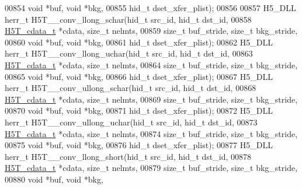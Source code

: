 \begin{DoxyCode}
00854                                      \textcolor{keywordtype}{void} *buf, \textcolor{keywordtype}{void} *bkg,
00855                                      hid\_t dset\_xfer\_plist);
00856 
00857 H5\_DLL herr\_t H5T\_\_conv\_llong\_schar(hid\_t src\_id, hid\_t dst\_id,
00858                     \hyperlink{struct_h5_t__cdata__t}{H5T\_cdata\_t} *cdata, \textcolor{keywordtype}{size\_t} nelmts,
00859                     \textcolor{keywordtype}{size\_t} buf\_stride, \textcolor{keywordtype}{size\_t} bkg\_stride,
00860                                     \textcolor{keywordtype}{void} *buf, \textcolor{keywordtype}{void} *bkg,
00861                                     hid\_t dset\_xfer\_plist);
00862 H5\_DLL herr\_t H5T\_\_conv\_llong\_uchar(hid\_t src\_id, hid\_t dst\_id,
00863                     \hyperlink{struct_h5_t__cdata__t}{H5T\_cdata\_t} *cdata, \textcolor{keywordtype}{size\_t} nelmts,
00864                     \textcolor{keywordtype}{size\_t} buf\_stride, \textcolor{keywordtype}{size\_t} bkg\_stride,
00865                                     \textcolor{keywordtype}{void} *buf, \textcolor{keywordtype}{void} *bkg,
00866                                     hid\_t dset\_xfer\_plist);
00867 H5\_DLL herr\_t H5T\_\_conv\_ullong\_schar(hid\_t src\_id, hid\_t dst\_id,
00868                      \hyperlink{struct_h5_t__cdata__t}{H5T\_cdata\_t} *cdata, \textcolor{keywordtype}{size\_t} nelmts,
00869                      \textcolor{keywordtype}{size\_t} buf\_stride, \textcolor{keywordtype}{size\_t} bkg\_stride,
00870                                      \textcolor{keywordtype}{void} *buf, \textcolor{keywordtype}{void} *bkg,
00871                                      hid\_t dset\_xfer\_plist);
00872 H5\_DLL herr\_t H5T\_\_conv\_ullong\_uchar(hid\_t src\_id, hid\_t dst\_id,
00873                      \hyperlink{struct_h5_t__cdata__t}{H5T\_cdata\_t} *cdata, \textcolor{keywordtype}{size\_t} nelmts,
00874                      \textcolor{keywordtype}{size\_t} buf\_stride, \textcolor{keywordtype}{size\_t} bkg\_stride,
00875                                      \textcolor{keywordtype}{void} *buf, \textcolor{keywordtype}{void} *bkg,
00876                                      hid\_t dset\_xfer\_plist);
00877 H5\_DLL herr\_t H5T\_\_conv\_llong\_short(hid\_t src\_id, hid\_t dst\_id,
00878                     \hyperlink{struct_h5_t__cdata__t}{H5T\_cdata\_t} *cdata, \textcolor{keywordtype}{size\_t} nelmts,
00879                     \textcolor{keywordtype}{size\_t} buf\_stride, \textcolor{keywordtype}{size\_t} bkg\_stride,
00880                                     \textcolor{keywordtype}{void} *buf, \textcolor{keywordtype}{void} *bkg,

\end{DoxyCode}
